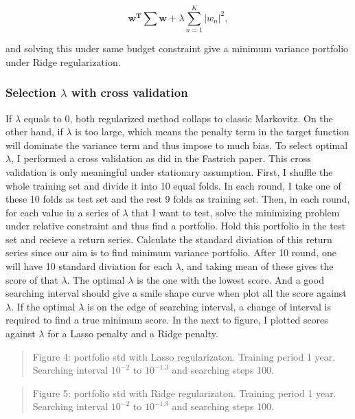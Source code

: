 \documentclass{article}
\newcommand{\ciapdf}[1]{\vspace*{-\parskip}\begin{center}\resizebox{0.75\textwidth}{!}{\texttt{[image: \#1]}}\end{center}}
\begin{document}
\begin{equation*}
\mathbf{w^T\sum w} + \lambda \sum_{n= 1}^{K}\left | w_n \right |^2,
\end{equation*}

and solving this under same budget constraint give a minimum variance portfolio
under Ridge regularization.

\subsubsection*{Selection $\lambda$ with cross validation}

If $\lambda$ equals to 0, both regularized method collaps to classic Markovitz.
On the other hand, if $\lambda$ is too large, which means the penalty term in
the target function will dominate the variance term and thus impose to much bias.
To select optimal $\lambda$, I performed a cross validation as did in the Fastrich
paper. This cross validation is only meaningful under stationary assumption.
First, I shuffle the whole training set and divide it into 10 equal folds.
In each round, I take one of these 10 folds as test set and the rest 9 folds as
training set. Then, in each round, for each value in a series of $\lambda$
that I want to test,
solve the minimizing problem under relative constraint and thus find a portfolio.
Hold this portfolio in the test set and recieve a return series. Calculate the
standard diviation of this return series since our aim is to find minimum
variance portfolio. After 10 round, one will have 10 standard diviation for each
$\lambda$, and taking mean of these gives the score of that $\lambda$. The
optimal $\lambda$ is the one with the lowest score. And a good searching
interval should give a smile shape curve when plot all the score against $\lambda$.
If the optimal $\lambda$ is on the edge of searching interval, a change of interval
is required to find a true minimum score. In the next to figure, I plotted
scores against $\lambda$ for a Lasso penalty and a Ridge penalty.



\ciapdf{Figure_4T2.pdf}

\begin{quote}
Figure 4: portfolio std with Lasso regularizaton. Training period 1 year. Searching
interval $10^{-2}$ to $10^{-1.3}$ and searching steps 100.
\end{quote}


\ciapdf{Figure_5T2.pdf}

\begin{quote}
Figure 5: portfolio std with Ridge regularizaton. Training period 1 year. Searching
interval $10^{-2}$ to $10^{-1.3}$ and searching steps 100.
\end{quote}
\end{document}
